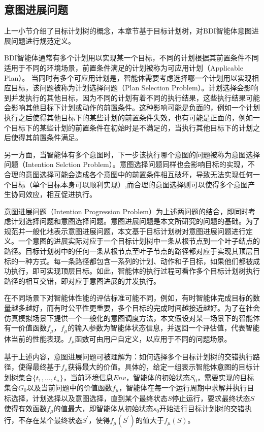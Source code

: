 \subsection{意图进展问题}
上一小节介绍了目标计划树的概念，本章节基于目标计划树，对BDI智能体意图进展问题进行规范定义。

BDI智能体通常有多个计划用以实现某一个目标，不同的计划根据其前置条件不同适用于不同的环境场景，前置条件满足的计划被称为可应用计划（Applicable Plan）。
当同时有多个可应用计划是，智能体需要考虑选择哪一个计划用以实现相应目标，该问题被称为计划选择问题（Plan Selection Problem）。计划选择会影响到并发执行的其他目标，因为不同的计划有着不同的执行结果，这些执行结果可能会影响其他目标下计划或动作的前置条件。这种影响可能是负面的，例如一个计划执行之后使得其他目标下的某些计划的前置条件失效，也有可能是正面的，例如一个目标下的某些计划的前置条件在初始时是不满足的，当执行其他目标下的计划之后使得其前置条件满足。

另一方面，当智能体有多个意图时，下一步该执行哪个意图的问题被称为意图选择问题（Intention Selction Problem）。意图选择问题同样也会影响目标的实现，不合理的意图选择可能会造成各个意图中的前置条件相互破坏，导致无法实现任何一个目标（单个目标本身可以顺利实现）,而合理的意图选择则可以使得多个意图产生协同效应，相互促进执行。

意图进展问题（Intention Progression Problem）为上述两问题的结合，即同时考虑计划选择问题和意图选择问题。意图进展问题是本文所研究的问题的基础。为了规范并一般化地表示意图进展问题，本文基于目标计划树对意图进展问题进行定义。一个意图的进展实际对应于一个目标计划树中一条从根节点到一个叶子结点的路径。目标计划树中的任何一条从根节点至叶子节点的路径都对应于实现其顶层目标的一种方式。每一条路径都包含一系列的计划、动作和子目标，如果他们都被成功执行，即可实现顶层目标。如此，智能体的执行过程可看作多个目标计划树执行路径的相互交错，即对应于意图进展的并发执行。

%
在不同场景下对智能体性能的评估标准可能不同，例如，有时智能体完成目标的数量越多越好，而有时公平性更重要，多个目标的完成时间越接近越好。为了在社会仿真模拟场景下提供一个一般化的意图调度方法，本文假设对某一场景下的智能体有一价值函数$f_{\mu}$，$f_{\mu}$的输入参数为智能体状态信息，并返回一个评估值，代表智能体当前的性能表现。$f_{\mu}$函数可由用户自定义，以应用于不同的问题场景。

基于上述内容，意图进展问题可被理解为：如何选择多个目标计划树的交错执行路径，使得最终基于$f_{\mu}$获得最大的价值。具体的，给定一组表示智能体意图的目标计划树集合$\{t_1, \dots, t_n\}$，当前环境信息$Env$，智能体的初始状态$S_0$，需要实现的目标集合$G_0$以及当前问题中的价值函数$f_{\mu}$，智能体在每一个运行周期中求解并执行目标选择，计划选择以及意图选择，直到某个最终状态$S$停止运行，要求最终状态$S$使得有效函数$f_{\mu}$的值最大，即智能体从初始状态$s_0$开始进行目标计划树的交错执行，不存在某个最终状态$S^{\prime}$，使得$f_{\mu}(S^{\prime})$的值大于$f_{\mu}(S)$。
